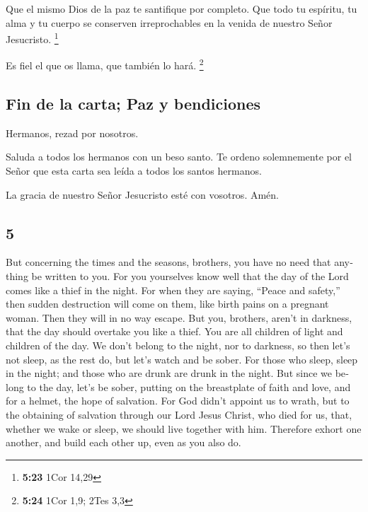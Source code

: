 \begin{paracol}{2}
 Que el mismo Dios de la paz te santifique por completo.
Que todo tu espíritu, tu alma y tu cuerpo se conserven irreprochables en
la venida de nuestro Señor Jesucristo. \footnote{\textbf{5:23} 1Cor
  14,29}

 Es fiel el que os llama, que también lo hará.
\footnote{\textbf{5:24} 1Cor 1,9; 2Tes 3,3}

\hypertarget{fin-de-la-carta-paz-y-bendiciones}{%
\subsection{Fin de la carta; Paz y
bendiciones}\label{fin-de-la-carta-paz-y-bendiciones}}

 Hermanos, rezad por nosotros.

 Saluda a todos los hermanos con un beso santo.
 Te ordeno solemnemente por el Señor que esta carta sea
leída a todos los santos hermanos.

 La gracia de nuestro Señor Jesucristo esté con vosotros.
Amén. \switchcolumn \begin{otherlanguage}{english}

\hypertarget{section-9}{%
\section{5}\label{section-9}}

 But concerning the times and the seasons, brothers, you
have no need that anything be written to you.  For you
yourselves know well that the day of the Lord comes like a thief in the
night.  For when they are saying, ``Peace and safety,''
then sudden destruction will come on them, like birth pains on a
pregnant woman. Then they will in no way escape.  But you,
brothers, aren't in darkness, that the day should overtake you like a
thief.  You are all children of light and children of the
day. We don't belong to the night, nor to darkness,  so
then let's not sleep, as the rest do, but let's watch and be sober.
 For those who sleep, sleep in the night; and those who
are drunk are drunk in the night.  But since we belong to
the day, let's be sober, putting on the breastplate of faith and love,
and for a helmet, the hope of salvation.  For God didn't
appoint us to wrath, but to the obtaining of salvation through our Lord
Jesus Christ,  who died for us, that, whether we wake or
sleep, we should live together with him.  Therefore
exhort one another, and build each other up, even as you also do.


\end{otherlanguage}
\end{paracol}
